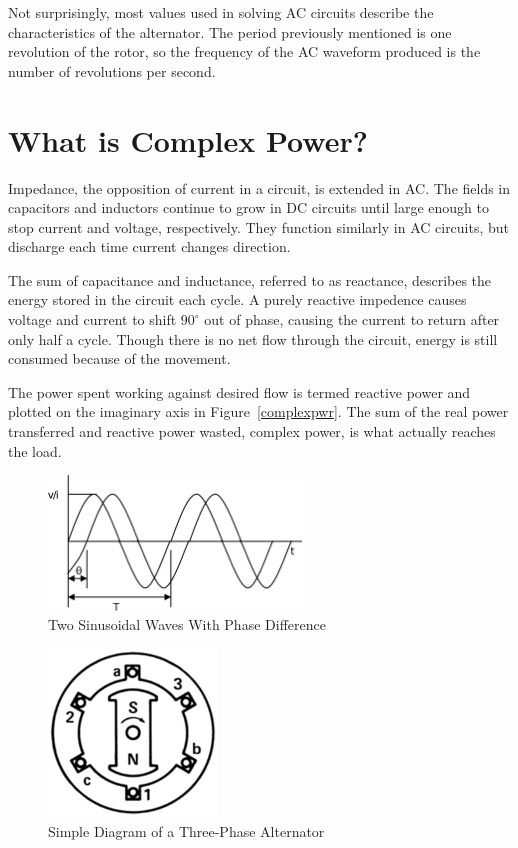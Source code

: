 \documentclass[12pt]{article}
\begin{document}
Not surprisingly, most values used in solving \ac{AC} circuits describe the
characteristics of the alternator.  The period previously mentioned is one
revolution of the rotor, so the frequency of the \ac{AC} waveform produced is
the number of revolutions per second.

\section*{What is Complex Power?}

Impedance, the opposition of current in a circuit, is extended in \ac{AC}.  The
fields in capacitors and inductors continue to grow in \ac{DC} circuits until
large enough to stop current and voltage, respectively.  They function
similarly in \ac{AC} circuits, but discharge each time current changes
direction.

The sum of capacitance and inductance, referred to as reactance, describes the
energy stored in the circuit each cycle.  A purely reactive impedence causes
voltage and current to shift $90^\circ$ out of phase, causing the current to
return after only half a cycle.  Though there is no net flow through the
circuit, energy is still consumed because of the movement.

The power spent working against desired flow is termed reactive power and
plotted on the imaginary axis in Figure~\ref{complexpwr}.  The sum of the real
power transferred and reactive power wasted, complex power, is what actually
reaches the load.

\begin{figure}[p]
	\centering
	\includegraphics[width=0.6\textwidth]{img/acwave}
	\caption{Two Sinusoidal Waves With Phase Difference}
	\label{acwave}
\end{figure}

\begin{figure}[p]
	\centering
	\includegraphics[width=0.4\textwidth]{img/threephasemotor}
	\caption{Simple Diagram of a Three-Phase Alternator}
	\label{alternator}
\end{figure}
\end{document}
